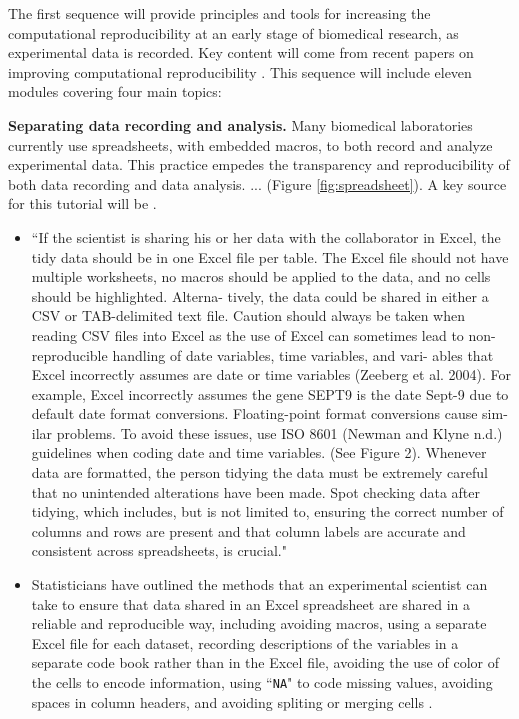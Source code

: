\documentclass[pdftex,english,11pt,parskip=half]{scrartcl}
\begin{document}
The first sequence will provide principles and tools for increasing the
computational reproducibility at an early stage of biomedical research, as
experimental data is recorded. Key content will come from recent papers on improving computational reproducibility \cite{ellis2018share, broman2018data}. This sequence will include eleven modules covering
four main topics: 

\textbf{Separating data recording and analysis.} Many biomedical laboratories currently use spreadsheets, with embedded macros, to both record and analyze experimental data. This practice empedes the transparency and reproducibility of both data recording and data analysis. ... (Figure \ref{fig:spreadsheet}). A key source for this tutorial will be \cite{broman2018data}.

\begin{itemize}
\item ``If the scientist is sharing his or her data with the collaborator in Excel, the tidy data should be in one Excel file per table. The Excel file should not have multiple worksheets, no macros should be applied to the data, and no cells should be highlighted. Alterna- tively, the data could be shared in either a CSV or TAB-delimited text file. Caution should always be taken when reading CSV files into Excel as the use of Excel can sometimes lead to non-reproducible handling of date variables, time variables, and vari- ables that Excel incorrectly assumes are date or time variables (Zeeberg et al. 2004). For example, Excel incorrectly assumes the gene SEPT9 is the date Sept-9 due to default date format conversions. Floating-point format conversions cause sim- ilar problems. To avoid these issues, use ISO 8601 (Newman and Klyne n.d.) guidelines when coding date and time variables. (See Figure 2). Whenever data are formatted, the person tidying the data must be extremely careful that no unintended alterations have been made. Spot checking data after tidying, which includes, but is not limited to, ensuring the correct number of columns and rows are present and that column labels are accurate and consistent across spreadsheets, is crucial." \cite{ellis2018share}
\item Statisticians have outlined the methods that an experimental scientist can take to ensure that data shared in an Excel spreadsheet are shared in a reliable and reproducible way, including avoiding macros, using a separate Excel file for each dataset, recording descriptions of the variables in a separate code book rather than in the Excel file, avoiding the use of color of the cells to encode information, using ``\texttt{NA}" to code missing values, avoiding spaces in column headers, and avoiding spliting or merging cells \cite{ellis2018share, broman2018data}.

\end{itemize}
\end{document}
